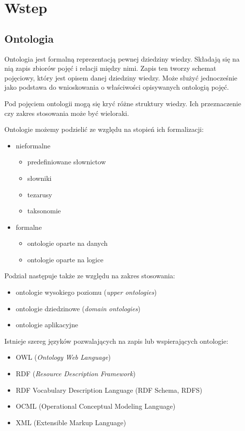 \section{Wstep}
\label{cha:wstep}

\subsection{Ontologia}
\label{sec:ont}

Ontologia jest formalną reprezentacją pewnej dziedziny wiedzy. Składają się na nią zapis zbiorów pojęć i relacji między nimi. Zapis ten tworzy schemat pojęciowy, który jest opisem danej dziedziny wiedzy. Może służyć jednocześnie jako podstawa do wnioskowania o właściwości opisywanych ontologią pojęć.	

Pod pojęciem ontologii mogą się kryć różne struktury wiedzy. Ich przeznaczenie czy zakres stosowania może być wieloraki.

Ontologie możemy podzielić ze względu na stopień ich formalizacji:
\begin{itemize}
\item nieformalne
	\begin{itemize}
		\item predefiniowane słownictow
		\item słowniki
		\item tezarusy
		\item taksonomie
	\end{itemize}
\item formalne
	\begin{itemize}
		\item ontologie oparte na danych
		\item ontologie oparte na logice
	\end{itemize}
\end{itemize}

Podział następuje także ze względu na zakres stosowania:
\begin{itemize}
\item ontologie wysokiego poziomu (\textit{upper ontologies})
\item ontologie dziedzinowe (\textit{domain ontologies})
\item ontologie aplikacyjne
\end{itemize}

Istnieje szereg języków pozwalających na zapis lub wspierających ontologie:
\begin{itemize}
\item OWL (\textit{Ontology Web Language})
\item RDF (\textit{Resource Description Framework})
\item RDF Vocabulary Description Language (RDF Schema, RDFS)
\item OCML (Operational Conceptual Modeling Language)
\item XML (Extensible Markup Language)
\end{itemize}

